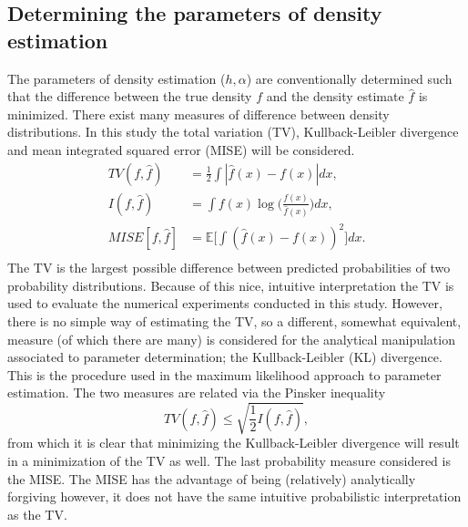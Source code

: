 \subsection{Determining the parameters of density estimation}
The parameters of density estimation ($h,\alpha$) are conventionally determined such that the difference between the true density $f$ and the density estimate $\hat{f}$ is minimized. There exist many measures of difference between density distributions. In this study the total variation (TV), Kullback-Leibler divergence and mean integrated squared error (MISE) will be considered.
\begin{equation}
	\begin{split}
		TV(f,\hat{f})&=\frac{1}{2}\int |\hat{f}(x)-f(x)|dx,\\
		I(f,\hat{f})&=\int f(x)\log\bigg(\frac{f(x)}{\hat{f}(x)}\bigg)dx,\\
		MISE[f,\hat{f}]&= \mathbb{E}\bigg[\int(\hat{f}(x)-f(x))^2\bigg]dx.\\
	\end{split}
\end{equation}
The TV is the largest possible difference between predicted probabilities of two probability distributions. Because of this nice, intuitive interpretation the TV is used to evaluate the numerical experiments conducted in this study. However, there is no simple way of estimating the TV, so a different, somewhat equivalent, measure (of which there are many) is considered for the analytical manipulation associated to parameter determination; the Kullback-Leibler (KL) divergence. This is the procedure used in the maximum likelihood approach to parameter estimation. The two measures are related via the Pinsker inequality
\begin{equation}
	TV(f,\hat{f})\leq \sqrt{\frac{1}{2}I(f,\hat{f})},
	\label{Pinsker}
\end{equation}
from which it is clear that minimizing the Kullback-Leibler divergence will result in a minimization of the TV as well. The last probability measure considered is the MISE. The MISE has the advantage of being (relatively) analytically forgiving however, it does not have the same intuitive probabilistic interpretation as the TV.


